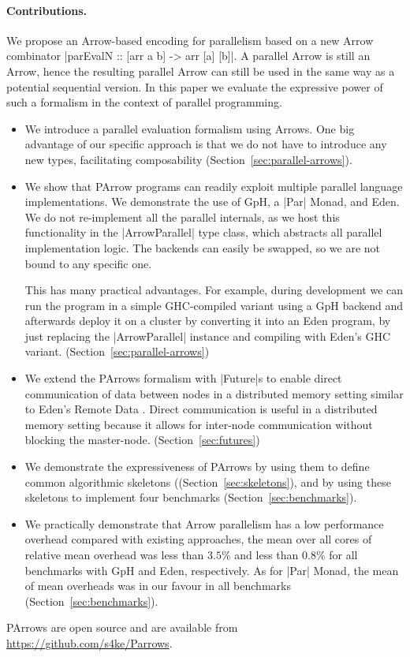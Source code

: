 \paragraph{Contributions.}
%
%
We propose an Arrow-based encoding for parallelism based on a new Arrow combinator |parEvalN :: [arr a b] -> arr [a] [b]|. A parallel Arrow is still an Arrow, hence the resulting parallel Arrow can still be used in the same way as a potential sequential version. In this paper we evaluate the expressive power of such a formalism in the context of parallel programming.

\begin{itemize}
\item We introduce a parallel evaluation formalism using Arrows. One big advantage of our specific approach is that we do not have to introduce any new types, facilitating composability (Section~\ref{sec:parallel-arrows}).
\item We show that PArrow programs can readily exploit multiple parallel language implementations. We demonstrate the use of GpH, a |Par| Monad, and Eden. We do not re-implement all the parallel internals, as we host this functionality in the |ArrowParallel| type class, which abstracts all parallel implementation logic. The backends can easily be swapped, so we are not bound to any specific one.

This has many practical advantages. For example, during development we can run the program in a simple GHC-compiled variant using a GpH backend and afterwards deploy it on a cluster by converting it into an Eden program, by just replacing the |ArrowParallel| instance and compiling with Eden's GHC variant. (Section~\ref{sec:parallel-arrows})
\item We extend the PArrows formalism with |Future|s to enable direct communication of data between nodes in a distributed memory setting similar to Eden's Remote Data \citep[|RD|,][]{Dieterle2010}. Direct communication is useful in a distributed memory setting because it allows for inter-node communication without blocking the master-node. (Section~\ref{sec:futures})
\item We demonstrate the expressiveness of PArrows by using them to define common algorithmic skeletons ((Section~\ref{sec:skeletons}), and by using these skeletons to implement four benchmarks (Section~\ref{sec:benchmarks}).
\item We practically demonstrate that Arrow parallelism has a low performance overhead compared with existing approaches, \eg the mean over all cores of relative mean overhead was less than $3.5\%$ and less than $0.8\%$ for all benchmarks with GpH and Eden, respectively. As for |Par| Monad, the mean of mean overheads was in our favour in all benchmarks (Section~\ref{sec:benchmarks}).
\end{itemize}

PArrows are open source and are available from \url{https://github.com/s4ke/Parrows}.